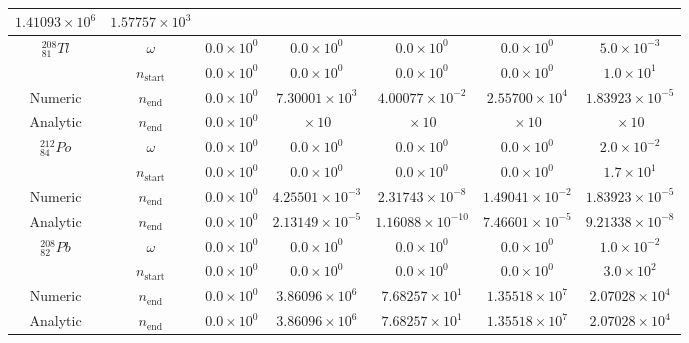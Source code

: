 \begin{table}[h]
\begin{center}
\begin{longtable}{c c c c c c c}
${1.41093} \times 10^{6}$ & ${1.57757} \times 10^{3}$ \\
\hline
${}^{208}_{81}Tl$ & $\omega$ & 
${0.0} \times 10^{0}$ & ${0.0} \times 10^{0}$ & ${0.0} \times 10^{0}$ &
${0.0} \times 10^{0}$ & ${5.0} \times 10^{-3}$ \\
 & $n_{\text{start}}$ & 
${0.0} \times 10^{0}$ & ${0.0} \times 10^{0}$ & ${0.0} \times 10^{0}$ &
${0.0} \times 10^{0}$ & ${1.0} \times 10^{1}$ \\
Numeric & $n_{\text{end}}$ & 
${0.0} \times 10^{0}$ & ${7.30001} \times 10^{3}$ & ${4.00077} \times 10^{-2}$ & 
${2.55700} \times 10^{4}$ & ${1.83923} \times 10^{-5}$ \\
Analytic & $n_{\text{end}}$ & 
${0.0} \times 10^{0}$ & ${} \times 10^{}$ & ${} \times 10^{}$ & 
${} \times 10^{}$ & ${} \times 10^{}$ \\
\hline
${}^{212}_{84}Po$ & $\omega$ & 
${0.0} \times 10^{0}$ & ${0.0} \times 10^{0}$ & ${0.0} \times 10^{0}$ &
${0.0} \times 10^{0}$ & ${2.0} \times 10^{-2}$ \\
 & $n_{\text{start}}$ & 
${0.0} \times 10^{0}$ & ${0.0} \times 10^{0}$ & ${0.0} \times 10^{0}$ &
${0.0} \times 10^{0}$ & ${1.7} \times 10^{1}$ \\
Numeric & $n_{\text{end}}$ & 
${0.0} \times 10^{0}$ & ${4.25501} \times 10^{-3}$ & ${2.31743} \times 10^{-8}$ & 
${1.49041} \times 10^{-2}$ & ${1.83923} \times 10^{-5}$ \\
Analytic & $n_{\text{end}}$ & 
${0.0} \times 10^{0}$ & ${2.13149} \times 10^{-5}$ & ${1.16088} \times 10^{-10}$ & 
${7.46601} \times 10^{-5}$ & ${9.21338} \times 10^{-8}$ \\
\hline
${}^{208}_{82}Pb$ & $\omega$ & 
${0.0} \times 10^{0}$ & ${0.0} \times 10^{0}$ & ${0.0} \times 10^{0}$ &
${0.0} \times 10^{0}$ & ${1.0} \times 10^{-2}$ \\
 & $n_{\text{start}}$ & 
${0.0} \times 10^{0}$ & ${0.0} \times 10^{0}$ & ${0.0} \times 10^{0}$ &
${0.0} \times 10^{0}$ & ${3.0} \times 10^{2}$ \\
Numeric & $n_{\text{end}}$ & 
${0.0} \times 10^{0}$ & ${3.86096} \times 10^{6}$ & ${7.68257} \times 10^{1}$ & 
${1.35518} \times 10^{7}$ & ${2.07028} \times 10^{4}$ \\
Analytic & $n_{\text{end}}$ & 
${0.0} \times 10^{0}$ & ${3.86096} \times 10^{6}$ & ${7.68257} \times 10^{1}$ & 
${1.35518} \times 10^{7}$ & ${2.07028} \times 10^{4}$ \\
\hline\hline
\end{longtable}
\end{center}
\caption{}
\label{table:po216trialdata}
\end{table}








